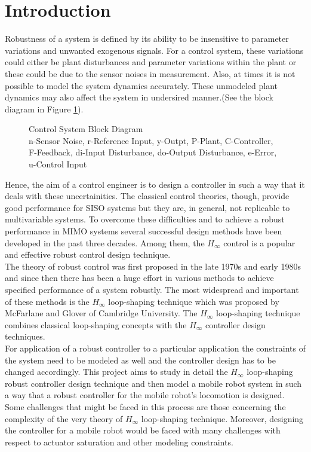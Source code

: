 \documentclass[a4paper,12pt]{article}
\begin{document}
\section{Introduction}
Robustness of a system is defined by its ability to be insensitive to parameter variations and unwanted exogenous signals. For a control system, these variations could either be plant disturbances and parameter variations within the plant or these could be due to the sensor noises in measurement. Also, at times it is not possible to model the system dynamics accurately. These unmodeled plant dynamics may also affect the system in undersired manner.(See the block diagram in Figure \ref{simple}).
\begin{figure}[H]
 
			  \centering
			  
			  
			  \caption{Control System Block Diagram\\ \footnotesize n-Sensor Noise, r-Reference Input, y-Outpt, P-Plant, C-Controller, F-Feedback, di-Input Disturbance, do-Output Disturbance, e-Error, u-Control Input}
			 \label{simple}
		\end{figure}	
	 Hence, the aim of a control engineer is to design a controller in such a way that it deals with these uncertainities. The classical control theories, though, provide good performance for SISO systems but they are, in general, not replicable to multivariable systems. To overcome these
difficulties and to achieve a robust performance in MIMO systems several successful design methods have been developed in the past three decades. Among them, the $H_{\infty}$ control is a popular and effective robust control design technique.  \\
The theory of robust control was first proposed in the late 1970s and early 1980s and since then there has been a huge effort in various methods to achieve specified performance of a system robustly. The most widespread and important of these methods is the $H_{\infty}$ loop-shaping technique which was proposed by McFarlane and Glover of Cambridge University. The $H_{\infty}$ loop-shaping technique combines classical loop-shaping concepts with the $H_{\infty}$ controller design techniques.  \\
For application of a robust controller to a particular application the constraints of the system need to be modeled as well and the controller design has to be changed accordingly. This project aims to study in detail the $H_{\infty}$ loop-shaping robust controller design technique and then model a mobile robot system in such a way that a robust controller for the mobile robot's locomotion is designed. Some challenges that might be faced in this process are those concerning the complexity of the very theory of  $H_{\infty}$	 loop-shaping technique. Moreover, designing the controller for a mobile robot would be faced with many challenges with respect to actuator saturation and other modeling constraints.\\
\end{document}

